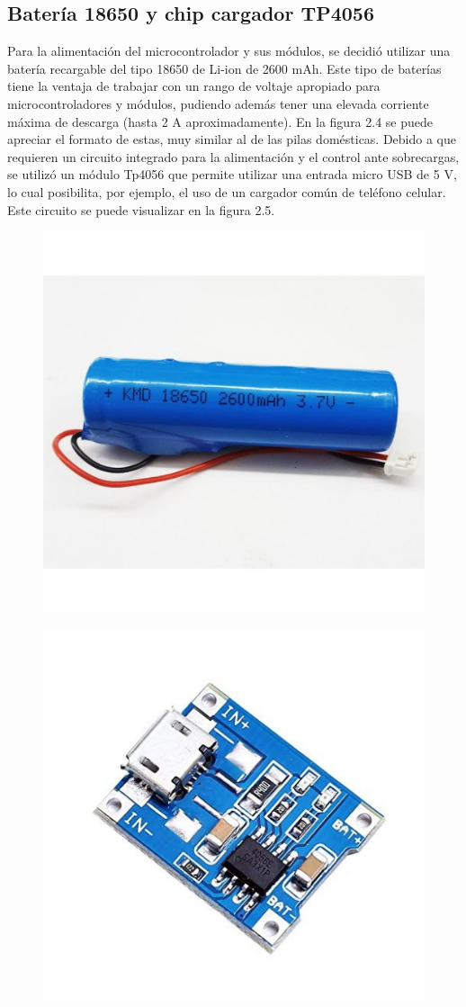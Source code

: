 \subsection{Batería 18650 y chip cargador TP4056}



Para la alimentación del microcontrolador y sus módulos, se decidió utilizar una batería recargable del tipo 18650 de Li-ion de 2600 mAh. Este tipo de baterías tiene la ventaja de trabajar con un rango de voltaje apropiado para microcontroladores y módulos, pudiendo además tener una elevada corriente máxima de descarga (hasta 2 A aproximadamente). En la figura 2.4 se puede apreciar el formato de estas, muy similar al de las pilas domésticas. Debido a que requieren un circuito integrado para la alimentación y el control ante sobrecargas, se utilizó un módulo Tp4056 que permite utilizar una entrada micro USB de 5 V, lo cual posibilita, por ejemplo, el uso de un cargador común de teléfono celular. Este circuito se puede visualizar en la figura 2.5.

\begin{figure}[H]
\centering
\begin{minipage}{.5\textwidth}
  \centering
  \includegraphics[width=.4\linewidth]{./Figures/18650.jpg}
  \label{fig:test1}
\end{minipage}%
\begin{minipage}{.5\textwidth}
  \centering
  \includegraphics[width=.4\linewidth]{./Figures/tp4056.jpg}
  \label{fig:test2}
\end{minipage}
\end{figure}

